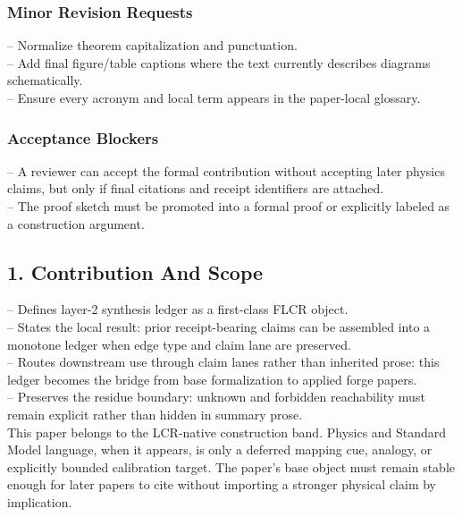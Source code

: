 \documentclass[11pt]{article}
\begin{document}
\subsubsection*{Minor Revision Requests}

\noindent{}-- Normalize theorem capitalization and punctuation.\\
\noindent{}-- Add final figure/table captions where the text currently describes diagrams schematically.\\
\noindent{}-- Ensure every acronym and local term appears in the paper-local glossary.\\

\subsubsection*{Acceptance Blockers}

\noindent{}-- A reviewer can accept the formal contribution without accepting later physics claims, but only if final citations and receipt identifiers are attached.\\
\noindent{}-- The proof sketch must be promoted into a formal proof or explicitly labeled as a construction argument.\\


\subsection*{1. Contribution And Scope}

\noindent{}-- Defines layer-2 synthesis ledger as a first-class FLCR object.\\
\noindent{}-- States the local result: prior receipt-bearing claims can be assembled into a monotone ledger when edge type and claim lane are preserved.\\
\noindent{}-- Routes downstream use through claim lanes rather than inherited prose: this ledger becomes the bridge from base formalization to applied forge papers.\\
\noindent{}-- Preserves the residue boundary: unknown and forbidden reachability must remain explicit rather than hidden in summary prose.\\

This paper belongs to the LCR-native construction band. Physics and Standard Model language, when it appears, is only a deferred mapping cue, analogy, or explicitly bounded calibration target. The paper's base object must remain stable enough for later papers to cite without importing a stronger physical claim by implication.
\end{document}
